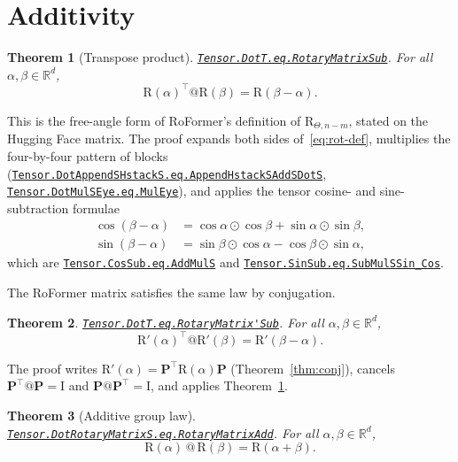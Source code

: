 \documentclass[11pt,a4paper]{article}
\newcommand{\lmod}[1]{\href{http://www.lemma.cn/lean/?module=#1}{\nolinkurl{#1}}}
\newtheorem{theorem}{Theorem}[section]
\newcommand{\R}{\mathbb{R}}
\newcommand{\rot}{\mathrm{R}}
\newcommand{\eye}{\mathrm{I}}
\begin{document}
\section{Additivity}
\label{sec:add}

\begin{theorem}[Transpose product]
\label{thm:dotT}
\lmod{Tensor.DotT.eq.RotaryMatrixSub}.
For all \(\alpha,\beta\in\R^d\),
\begin{equation}
  \rot(\alpha)^\top @ \rot(\beta) = \rot(\beta-\alpha).
\end{equation}
\end{theorem}

This is the free-angle form of RoFormer's definition of \(\rot_{\Theta,n-m}\), stated on the Hugging Face matrix.
The proof expands both sides of~\eqref{eq:rot-def}, multiplies the four-by-four pattern of blocks
(\lmod{Tensor.DotAppendSHstackS.eq.AppendHstackSAddSDotS},
\lmod{Tensor.DotMulSEye.eq.MulEye}),
and applies the tensor cosine- and sine-subtraction formulae
\begin{align}
  \cos(\beta-\alpha)&=\cos\alpha\odot\cos\beta+\sin\alpha\odot\sin\beta,
  \label{eq:cos-sub}\\
  \sin(\beta-\alpha)&=\sin\beta\odot\cos\alpha-\cos\beta\odot\sin\alpha,
  \label{eq:sin-sub}
\end{align}
which are
\lmod{Tensor.CosSub.eq.AddMulS} and
\lmod{Tensor.SinSub.eq.SubMulSSin_Cos}.

The RoFormer matrix satisfies the same law by conjugation.

\begin{theorem}
\label{thm:dotTp}
\lmod{Tensor.DotT.eq.RotaryMatrix'Sub}.
For all \(\alpha,\beta\in\R^d\),
\begin{equation}
  \rot'(\alpha)^\top @ \rot'(\beta) = \rot'(\beta-\alpha).
\end{equation}
\end{theorem}

The proof writes \(\rot'(\alpha)=\boldsymbol{P}^\top\rot(\alpha)\boldsymbol{P}\) (Theorem~\ref{thm:conj}), cancels \(\boldsymbol{P}^\top@\boldsymbol{P}=\eye\) and \(\boldsymbol{P}@\boldsymbol{P}^\top=\eye\), and applies Theorem~\ref{thm:dotT}.

\begin{theorem}[Additive group law]
\label{thm:add}
\lmod{Tensor.DotRotaryMatrixS.eq.RotaryMatrixAdd}.
For all \(\alpha,\beta\in\R^d\),
\begin{equation}
  \rot(\alpha)\,@\,\rot(\beta) = \rot(\alpha+\beta).
\end{equation}
\end{theorem}
\end{document}
